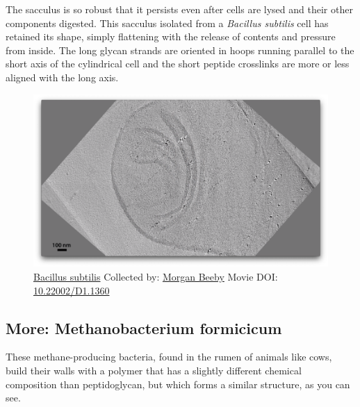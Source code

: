 \documentclass[]{tufte-book}
\begin{document}
The sacculus is so robust that it persists even after cells are lysed
and their other components digested. This sacculus isolated from a
\emph{Bacillus subtilis} cell has retained its shape, simply flattening
with the release of contents and pressure from inside. The long glycan
strands are oriented in hoops running parallel to the short axis of the
cylindrical cell and the short peptide crosslinks are more or less
aligned with the long axis.





\begin{figure}
\includegraphics{movie_stills/2_2a} \caption[\protect\hyperlink{tree}{Bacillus subtilis} Collected by:
\protect\hyperlink{morgan_beeby}{Morgan Beeby} Movie DOI:
\href{https://doi.org/10.22002/D1.1360}{10.22002/D1.1360}]{\protect\hyperlink{tree}{Bacillus subtilis} Collected by:
\protect\hyperlink{morgan_beeby}{Morgan Beeby} Movie DOI:
\href{https://doi.org/10.22002/D1.1360}{10.22002/D1.1360}}\label{fig:2-2a}
\end{figure}

\hypertarget{Methanobacterium_formicicum}{\subsection*{More:
Methanobacterium formicicum}\label{Methanobacterium_formicicum}}

These methane-producing bacteria, found in the rumen of animals like
cows, build their walls with a polymer that has a slightly different
chemical composition than peptidoglycan, but which forms a similar
structure, as you can see.
\end{document}
